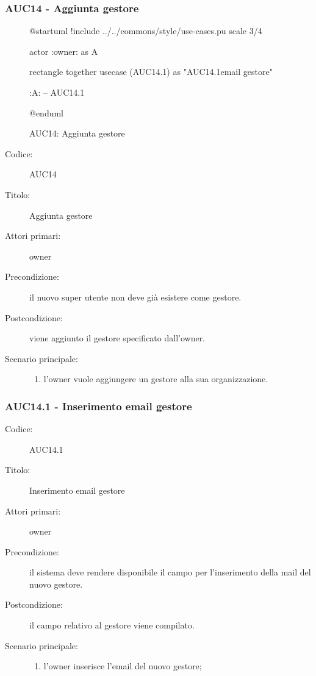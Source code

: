 \documentclass[../analisi-dei-requisiti.tex]{subfiles}
\begin{document}
\subsubsection{AUC14 - Aggiunta gestore}%
\label{subsub:AUC14}

\begin{figure}[h!]
  \centering
  \begin{plantuml}
  @startuml
  !include ../../commons/style/use-cases.pu
  scale 3/4

  actor :owner: as A

  rectangle {
    together {
      usecase (AUC14.1) as "AUC14.1\nInserimento email gestore"
    }
  }

  :A: -- AUC14.1

  @enduml
  \end{plantuml}
  \caption{AUC14: Aggiunta gestore}
  \label{fig:auc14}
\end{figure}

\begin{description}
  \item[Codice:] AUC14
  \item[Titolo:] Aggiunta gestore
  \item[Attori primari:] owner
  \item[Precondizione:] il nuovo super utente non deve già esistere come gestore.
  \item[Postcondizione:] viene aggiunto il gestore specificato dall'owner.
  \item[Scenario principale:]
  \begin{enumerate}
    \item l'owner vuole aggiungere un gestore alla sua organizzazione.
  \end{enumerate}
\end{description}

\subsubsection{AUC14.1 - Inserimento email gestore}%
\label{subsub:AUC14.1}
\begin{description}
  \item[Codice:] AUC14.1
  \item[Titolo:] Inserimento email gestore
  \item[Attori primari:] owner
  \item[Precondizione:] il sistema deve rendere disponibile il campo per l'inserimento della mail del nuovo gestore.
  \item[Postcondizione:] il campo relativo al gestore viene compilato.
  \item[Scenario principale:]
  \begin{enumerate}
    \item l'owner inserisce l'email del nuovo gestore;
  \end{enumerate}
\end{description}
\end{document}
